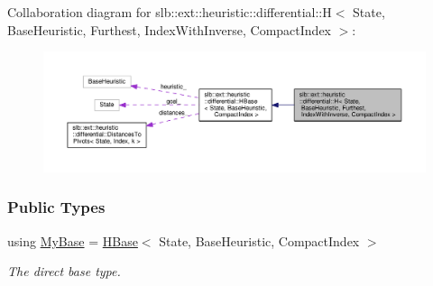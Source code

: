 Collaboration diagram for slb\+:\+:ext\+:\+:heuristic\+:\+:differential\+:\+:H$<$ State, Base\+Heuristic, Furthest, Index\+With\+Inverse, Compact\+Index $>$\+:\nopagebreak
\begin{figure}[H]
\begin{center}
\leavevmode
\includegraphics[width=350pt]{structslb_1_1ext_1_1heuristic_1_1differential_1_1H_3_01State_00_01BaseHeuristic_00_01Furthest_00e9395ee60bcf979f0e0cccc90c5a7dfe}
\end{center}
\end{figure}
\subsubsection*{Public Types}
\begin{DoxyCompactItemize}
\item 
using \hyperlink{structslb_1_1ext_1_1heuristic_1_1differential_1_1H_3_01State_00_01BaseHeuristic_00_01Furthest_0071671274a92eae86902a47a514057667_a11a59768ca1e8307b7b69daa0b0197ed}{My\+Base} = \hyperlink{structslb_1_1ext_1_1heuristic_1_1differential_1_1HBase}{H\+Base}$<$ State, Base\+Heuristic, Compact\+Index $>$\hypertarget{structslb_1_1ext_1_1heuristic_1_1differential_1_1H_3_01State_00_01BaseHeuristic_00_01Furthest_0071671274a92eae86902a47a514057667_a11a59768ca1e8307b7b69daa0b0197ed}{}\label{structslb_1_1ext_1_1heuristic_1_1differential_1_1H_3_01State_00_01BaseHeuristic_00_01Furthest_0071671274a92eae86902a47a514057667_a11a59768ca1e8307b7b69daa0b0197ed}

\begin{DoxyCompactList}\small\item\em The direct base type. \end{DoxyCompactList}\end{DoxyCompactItemize}
